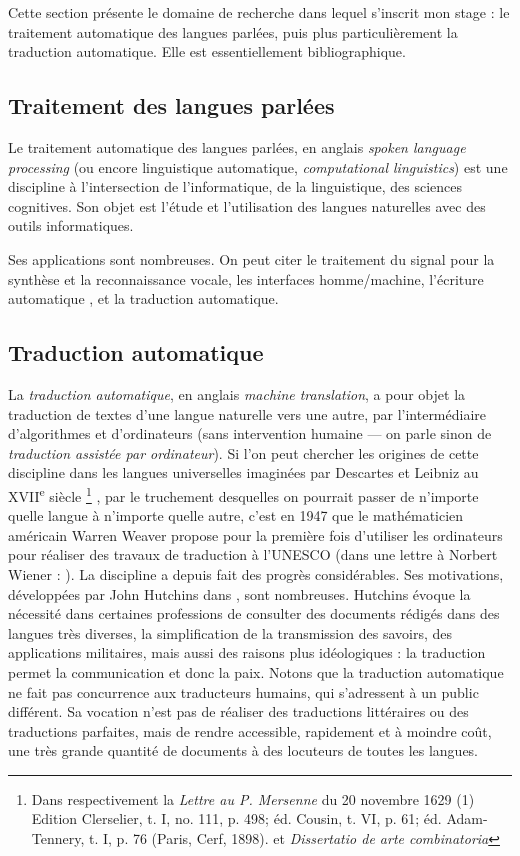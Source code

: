\documentclass[a4paper,10pt]{article}
\begin{document}
Cette section présente le domaine de recherche dans lequel s'inscrit mon stage : le traitement automatique des langues parlées, puis plus particulièrement la traduction automatique. Elle est essentiellement bibliographique.

\subsection{Traitement des langues parlées}

Le traitement automatique des langues parlées, en anglais \emph{spoken language processing} (ou encore linguistique automatique, \emph{computational linguistics}) est une discipline à l'intersection de l'informatique, de la linguistique, des sciences cognitives. Son objet est l'étude et l'utilisation des langues naturelles avec des outils informatiques.

Ses applications sont nombreuses. On peut citer le traitement du signal pour la synthèse et la reconnaissance vocale, les interfaces homme/machine, l'écriture automatique %
, et la traduction automatique.



\subsection{Traduction automatique}

La \emph{traduction automatique}, en anglais \emph{machine translation}, a pour objet la traduction de textes d'une langue naturelle vers une autre, par l'intermédiaire d'algorithmes et d'ordinateurs (sans intervention humaine --- on parle sinon de \emph{traduction assistée par ordinateur}). Si l'on peut chercher les origines de cette discipline dans les langues universelles imaginées par Descartes et Leibniz au XVII\textsuperscript{e} siècle
\footnote{Dans respectivement la \emph{Lettre au P. Mersenne} du 20 novembre 1629
(1) Edition Clerselier, t. I, no. 111, p. 498; éd. Cousin, t. VI, p. 61; éd. Adam-Tennery, t. I, p. 76 (Paris, Cerf, 1898).
et \emph{Dissertatio de arte combinatoria}}
, par le truchement desquelles on pourrait passer de n'importe quelle langue à n'importe quelle autre, c'est en 1947 que le mathématicien américain Warren Weaver propose pour la première fois d'utiliser les ordinateurs pour réaliser des travaux de traduction à l'UNESCO (dans une lettre à Norbert Wiener : \cite{weaver1947letters}).
La discipline a depuis fait des progrès considérables. Ses motivations, développées par John Hutchins dans \cite{hutchins1986machine}, 
sont nombreuses. Hutchins évoque la nécessité dans certaines professions de consulter des documents rédigés dans des langues très diverses, la simplification de la transmission des savoirs, des applications militaires, mais aussi des raisons plus idéologiques : la traduction permet la communication et donc la paix. Notons que la traduction automatique ne fait pas concurrence aux traducteurs humains, qui s'adressent à un public différent. Sa vocation n'est pas de réaliser des traductions littéraires ou des traductions parfaites, mais de rendre accessible, rapidement et à moindre coût, une très grande quantité de documents à des locuteurs de toutes les langues.
\end{document}
